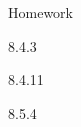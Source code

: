 \begin{frame}{Homework}
  \begin{center}

  8.4.3

  \vspace{2em}

  8.4.11

  \vspace{2em}

  8.5.4


  \end{center}
\end{frame}








